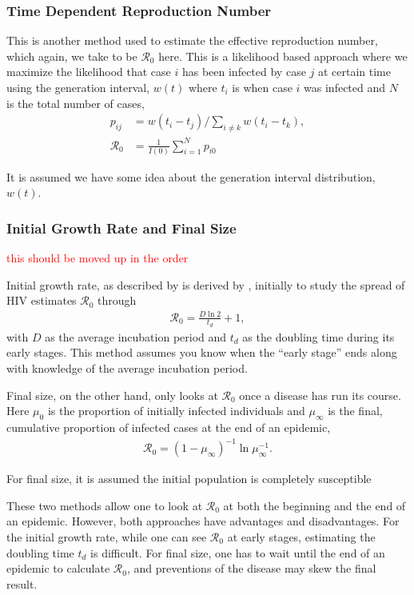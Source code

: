 \documentclass[12pt]{article}
\newcommand{\com}[1]{\textcolor{red}{ #1}}
\newcommand{\rr}{\ensuremath{\mathcal{R}_0}}
\begin{document}

\subsubsection{Time Dependent Reproduction Number}\label{sec:timedep}
This is another method used to estimate the effective reproduction number, which again, we take to be $\rr$ here.  This is a likelihood based approach where we maximize the likelihood that case $i$ has been infected by case $j$ at certain time using the generation interval, $w(t)$ where $t_i$ is when case $i$ was infected and $N$ is the total number of cases,
\begin{align*}
  p_{ij} &= w(t_i- t_j) / \sum_{i \neq k} w(t_i - t_k),\\
  \rr &= \frac{1}{I(0)}\sum_{i=1}^N p_{i0}
  \end{align*}

  It is assumed we have some idea about the generation interval distribution, $w(t)$.

\subsubsection{Initial Growth Rate and Final Size}
\label{sec:igr-fs}
\com{this should be moved up in the order}

Initial growth rate, as described by \cite{dietz1993estimation} is derived by \cite{anderson1986}, initially to study the spread of HIV estimates $\rr$ through
\begin{align*}
\rr = \frac{D \ln 2} {t_d} + 1,
  \end{align*}
  with $D$ as the average incubation period and $t_d$ as the doubling time during its early stages.  This method assumes you know when the ``early stage'' ends along with knowledge of the average incubation period.  

  Final size, on the other hand, only looks at $\rr$ once a disease has run its course.  Here $\mu_0$ is the proportion of initially infected individuals and $\mu_\infty$ is the final, cumulative proportion of infected cases at the end of an epidemic,
  \begin{align*}
    \rr = (1- \mu_\infty)^{-1} \ln \mu_\infty^{-1}.
  \end{align*}

  For final size, it is assumed the initial population is completely susceptible

  These two methods allow one to look at $\rr$ at both the beginning and the end of an epidemic.  However, both approaches have advantages and disadvantages.  For the initial growth rate, while one can see $\rr$ at early stages, estimating the doubling time $t_d$ is difficult.  For final size, one has to wait until the end of an epidemic to calculate $\rr$, and preventions of the disease may skew the final result.
\end{document}
